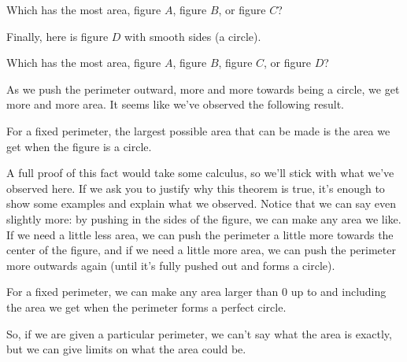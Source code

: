 \documentclass{ximera}
\begin{document}
\begin{example}
\begin{image}
\end{image}
\begin{question}
Which has the most area, figure $A$, figure $B$, or figure $C$?
\begin{multipleChoice}
\end{multipleChoice}
\end{question}


Finally, here is figure $D$ with smooth sides (a circle).
\begin{image}
\end{image}
\begin{question}
Which has the most area, figure $A$, figure $B$, figure $C$, or figure $D$?
\begin{multipleChoice}
\end{multipleChoice}
\end{question}

\end{example}
As we push the perimeter outward, more and more towards being a circle, we get more and more area. It seems like we've observed the following result.
\begin{theorem}
For a fixed perimeter, the largest possible area that can be made is the area we get when the figure is a circle. 
\end{theorem}
A full proof of this fact would take some calculus, so we'll stick with what we've observed here. If we ask you to justify why this theorem is true, it's enough to show some examples and explain what we observed. Notice that we can say even slightly more: by pushing in the sides of the figure, we can make any area we like. If we need a little less area, we can push the perimeter a little more towards the center of the figure, and if we need a little more area, we can push the perimeter more outwards again (until it's fully pushed out and forms a circle).
\begin{theorem}
For a fixed perimeter, we can make any area larger than $0$ up to and including the area we get when the perimeter forms a perfect circle.
\end{theorem}
So, if we are given a particular perimeter, we can't say what the area is exactly, but we can give limits on what the area could be.
\end{document}

